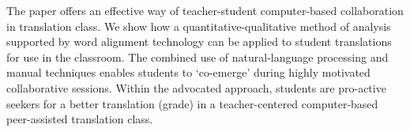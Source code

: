 The paper offers an effective way of teacher-student computer-based collaboration in translation class. We show how a quantitative-qualitative method of analysis supported by word alignment technology can be applied to student translations for use in the classroom. The combined use of natural-language processing and manual techniques enables students to ‘co-emerge' during highly motivated collaborative sessions. Within the advocated approach, students are pro-active seekers for a better translation (grade) in a teacher-centered computer-based peer-assisted translation class.
